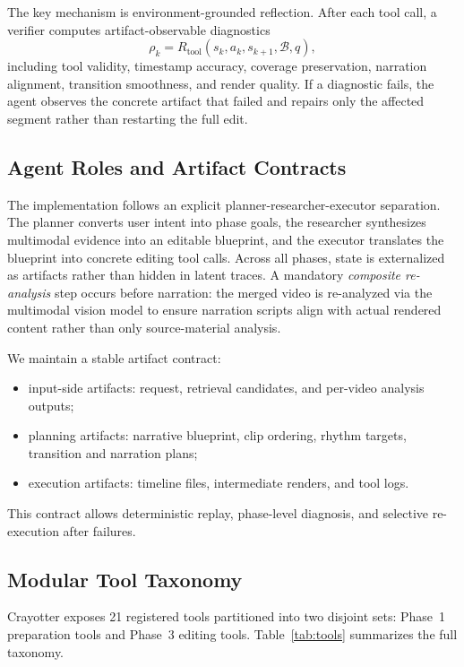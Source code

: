 ﻿\documentclass[11pt]{article}
\begin{document}
The key mechanism is environment-grounded reflection. After each tool call, a
verifier computes artifact-observable diagnostics
\[
    \rho_k =
    R_{\mathrm{tool}}(s_k,a_k,s_{k+1},\mathcal{B},q),
\]
including tool validity, timestamp accuracy, coverage preservation, narration
alignment, transition smoothness, and render quality. If a diagnostic fails,
the agent observes the concrete artifact that failed and repairs only the
affected segment rather than restarting the full edit.

\subsection{Agent Roles and Artifact Contracts}

The implementation follows an explicit planner-researcher-executor separation.
The planner converts user intent into phase goals, the researcher synthesizes
multimodal evidence into an editable blueprint, and the executor translates the
blueprint into concrete editing tool calls. Across all phases, state is
externalized as artifacts rather than hidden in latent traces.
A mandatory \emph{composite re-analysis} step occurs before narration: the
merged video is re-analyzed via the multimodal vision model to ensure narration
scripts align with actual rendered content rather than only source-material
analysis.

We maintain a stable artifact contract:
\begin{itemize}
\item input-side artifacts: request, retrieval candidates, and per-video
analysis outputs;
\item planning artifacts: narrative blueprint, clip ordering, rhythm targets,
transition and narration plans;
\item execution artifacts: timeline files, intermediate renders, and tool logs.
\end{itemize}
This contract allows deterministic replay, phase-level diagnosis, and selective
re-execution after failures.

\subsection{Modular Tool Taxonomy}

Crayotter exposes 21 registered tools partitioned into two disjoint sets:
Phase~1 preparation tools and Phase~3 editing tools.
Table~\ref{tab:tools} summarizes the full taxonomy.
\end{document}
